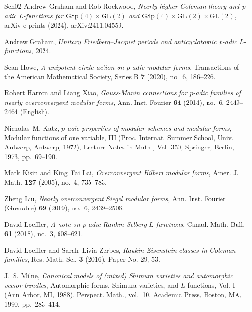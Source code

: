 \begin{thebibliography}{{Sch}02}
Andrew {Graham} and Rob {Rockwood}, \emph{{{N}early higher Coleman theory and
  p-adic L-functions for $\mathrm{GSp}(4) \times \mathrm{GL}(2)$ and
  $\mathrm{GSp}(4) \times \mathrm{GL}(2) \times \mathrm{GL}(2)$}}, arXiv
  e-prints (2024), arXiv:2411.04559.

Andrew Graham, \emph{{U}nitary {F}riedberg--{J}acquet periods and
  anticyclotomic p-adic {L}-functions}, 2024.

Sean Howe, \emph{A unipotent circle action on {$p$}-adic modular forms},
  Transactions of the American Mathematical Society, Series B \textbf{7}
  (2020), no.~6, 186--226.

Robert Harron and Liang Xiao, \emph{Gauss-{Manin} connections for
  {{\(p\)}}-adic families of nearly overconvergent modular forms}, Ann. Inst.
  Fourier \textbf{64} (2014), no.~6, 2449--2464 (English).

Nicholas~M. Katz, \emph{{$p$}-adic properties of modular schemes and modular
  forms}, Modular functions of one variable, {III} ({P}roc. {I}nternat.
  {S}ummer {S}chool, {U}niv. {A}ntwerp, {A}ntwerp, 1972), Lecture Notes in
  Math., Vol. 350, Springer, Berlin, 1973, pp.~69--190.

Mark Kisin and King~Fai Lai, \emph{Overconvergent {H}ilbert modular forms},
  Amer. J. Math. \textbf{127} (2005), no.~4, 735--783. 

Zheng Liu, \emph{Nearly overconvergent {S}iegel modular forms}, Ann. Inst.
  Fourier (Grenoble) \textbf{69} (2019), no.~6, 2439--2506. 

David Loeffler, \emph{A note on {$p$}-adic {R}ankin-{S}elberg {$L$}-functions},
  Canad. Math. Bull. \textbf{61} (2018), no.~3, 608--621. 

David Loeffler and Sarah~Livia Zerbes, \emph{Rankin-{E}isenstein classes in
  {C}oleman families}, Res. Math. Sci. \textbf{3} (2016), Paper No. 29, 53.

J.~S. Milne, \emph{Canonical models of (mixed) {S}himura varieties and
  automorphic vector bundles}, Automorphic forms, {S}himura varieties, and
  {$L$}-functions, {V}ol. {I} ({A}nn {A}rbor, {MI}, 1988), Perspect. Math.,
  vol.~10, Academic Press, Boston, MA, 1990, pp.~283--414. 


\end{thebibliography}

